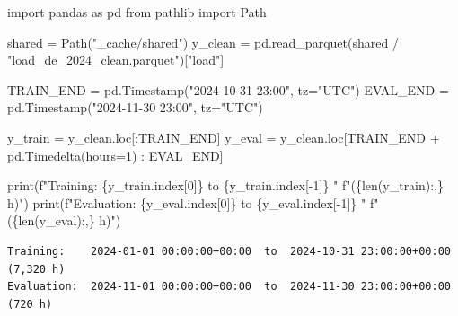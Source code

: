 \documentclass[
  english,
  letterpaper,
]{scrbook}
\newenvironment{Shaded}{\begin{snugshade}}{\end{snugshade}}
\newcommand{\BuiltInTok}[1]{\textcolor[rgb]{0.00,0.23,0.31}{#1}}
\newcommand{\DecValTok}[1]{\textcolor[rgb]{0.68,0.00,0.00}{#1}}
\newcommand{\ImportTok}[1]{\textcolor[rgb]{0.00,0.46,0.62}{#1}}
\newcommand{\NormalTok}[1]{\textcolor[rgb]{0.00,0.23,0.31}{#1}}
\newcommand{\OperatorTok}[1]{\textcolor[rgb]{0.37,0.37,0.37}{#1}}
\newcommand{\SpecialCharTok}[1]{\textcolor[rgb]{0.37,0.37,0.37}{#1}}
\newcommand{\SpecialStringTok}[1]{\textcolor[rgb]{0.13,0.47,0.30}{#1}}
\newcommand{\StringTok}[1]{\textcolor[rgb]{0.13,0.47,0.30}{#1}}
\begin{document}
\protect{}\label{split-data}
\begin{Shaded}
\begin{Highlighting}[]
\ImportTok{import}\NormalTok{ pandas }\ImportTok{as}\NormalTok{ pd}
\ImportTok{from}\NormalTok{ pathlib }\ImportTok{import}\NormalTok{ Path}

\NormalTok{shared }\OperatorTok{=}\NormalTok{ Path(}\StringTok{"\_cache/shared"}\NormalTok{)}
\NormalTok{y\_clean }\OperatorTok{=}\NormalTok{ pd.read\_parquet(shared }\OperatorTok{/} \StringTok{"load\_de\_2024\_clean.parquet"}\NormalTok{)[}\StringTok{"load"}\NormalTok{]}

\NormalTok{TRAIN\_END }\OperatorTok{=}\NormalTok{ pd.Timestamp(}\StringTok{"2024{-}10{-}31 23:00"}\NormalTok{, tz}\OperatorTok{=}\StringTok{"UTC"}\NormalTok{)}
\NormalTok{EVAL\_END  }\OperatorTok{=}\NormalTok{ pd.Timestamp(}\StringTok{"2024{-}11{-}30 23:00"}\NormalTok{, tz}\OperatorTok{=}\StringTok{"UTC"}\NormalTok{)}

\NormalTok{y\_train }\OperatorTok{=}\NormalTok{ y\_clean.loc[:TRAIN\_END]}
\NormalTok{y\_eval  }\OperatorTok{=}\NormalTok{ y\_clean.loc[TRAIN\_END }\OperatorTok{+}\NormalTok{ pd.Timedelta(hours}\OperatorTok{=}\DecValTok{1}\NormalTok{) : EVAL\_END]}

\BuiltInTok{print}\NormalTok{(}\SpecialStringTok{f"Training:    }\SpecialCharTok{\{}\NormalTok{y\_train}\SpecialCharTok{.}\NormalTok{index[}\DecValTok{0}\NormalTok{]}\SpecialCharTok{\}}\SpecialStringTok{  to  }\SpecialCharTok{\{}\NormalTok{y\_train}\SpecialCharTok{.}\NormalTok{index[}\OperatorTok{{-}}\DecValTok{1}\NormalTok{]}\SpecialCharTok{\}}\SpecialStringTok{  "}
      \SpecialStringTok{f"(}\SpecialCharTok{\{}\BuiltInTok{len}\NormalTok{(y\_train)}\SpecialCharTok{:,\}}\SpecialStringTok{ h)"}\NormalTok{)}
\BuiltInTok{print}\NormalTok{(}\SpecialStringTok{f"Evaluation:  }\SpecialCharTok{\{}\NormalTok{y\_eval}\SpecialCharTok{.}\NormalTok{index[}\DecValTok{0}\NormalTok{]}\SpecialCharTok{\}}\SpecialStringTok{  to  }\SpecialCharTok{\{}\NormalTok{y\_eval}\SpecialCharTok{.}\NormalTok{index[}\OperatorTok{{-}}\DecValTok{1}\NormalTok{]}\SpecialCharTok{\}}\SpecialStringTok{  "}
      \SpecialStringTok{f"(}\SpecialCharTok{\{}\BuiltInTok{len}\NormalTok{(y\_eval)}\SpecialCharTok{:,\}}\SpecialStringTok{ h)"}\NormalTok{)}
\end{Highlighting}
\end{Shaded}

\begin{verbatim}
Training:    2024-01-01 00:00:00+00:00  to  2024-10-31 23:00:00+00:00  (7,320 h)
Evaluation:  2024-11-01 00:00:00+00:00  to  2024-11-30 23:00:00+00:00  (720 h)
\end{verbatim}
\end{document}
